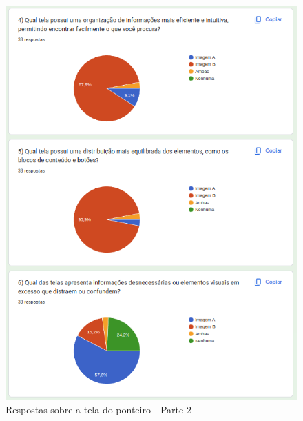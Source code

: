 \begin{figure}[!h]
	\begin{center}
	    \includegraphics[scale=0.7]{figs/Answers/Students/18.png}
	\end{center}
	\caption{\label{APB_TPon02}Respostas sobre a tela do ponteiro - Parte 2}
\end{figure}

\newpage


